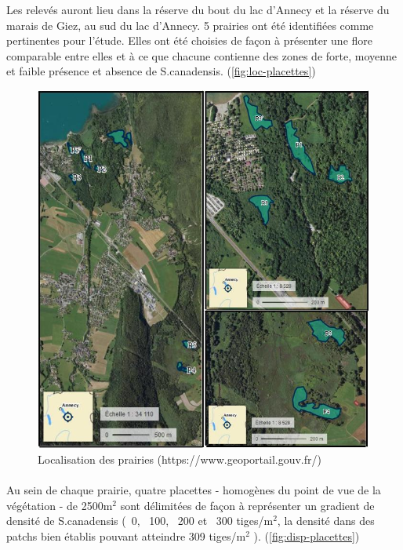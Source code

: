 \documentclass{article}
\begin{document}
	Les relevés auront lieu dans la réserve du bout du lac d'Annecy et la réserve du marais de Giez, au sud du lac d'Annecy. 5 prairies ont été identifiées comme pertinentes pour l'étude. Elles ont été choisies de façon à présenter une flore comparable entre elles et à ce que chacune contienne des zones de forte, moyenne et faible présence et absence de S.canadensis. (\autoref{fig:loc-placettes})
	\begin{figure}[h]
		\includegraphics[width=\linewidth]{loc-placettes.jpg}
		\caption{Localisation des prairies (https://www.geoportail.gouv.fr/)}
		\label{fig:loc-placettes}
	\end{figure}
	\paragraph{} Au sein de chaque prairie, quatre placettes - homogènes du point de vue de la végétation - de 2500m$^2$ sont délimitées de façon à représenter un gradient de densité de S.canadensis (~0, ~100, ~200 et ~300 tiges/m$^2$, la densité dans des patchs bien établis pouvant atteindre 309 tiges/m$^2$ \cite{weber_biological_2000}). (\autoref{fig:disp-placettes})\\
	
\end{document}
